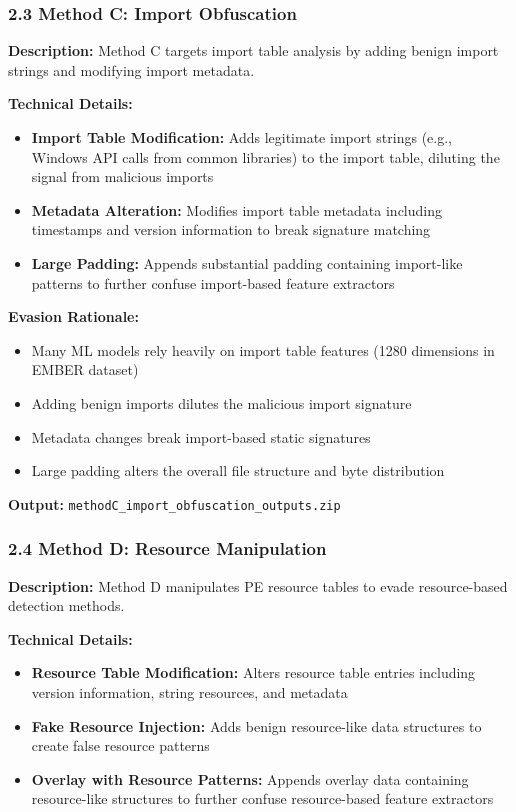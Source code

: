 \documentclass[12pt,letterpaper]{article}
\begin{document}
\subsubsection*{2.3 Method C: Import Obfuscation}

\textbf{Description:} Method C targets import table analysis by adding benign import strings and modifying import metadata.

\textbf{Technical Details:}
\begin{itemize}
    \item \textbf{Import Table Modification:} Adds legitimate import strings (e.g., Windows API calls from common libraries) to the import table, diluting the signal from malicious imports
    \item \textbf{Metadata Alteration:} Modifies import table metadata including timestamps and version information to break signature matching
    \item \textbf{Large Padding:} Appends substantial padding containing import-like patterns to further confuse import-based feature extractors
\end{itemize}

\textbf{Evasion Rationale:}
\begin{itemize}
    \item Many ML models rely heavily on import table features (1280 dimensions in EMBER dataset)
    \item Adding benign imports dilutes the malicious import signature
    \item Metadata changes break import-based static signatures
    \item Large padding alters the overall file structure and byte distribution
\end{itemize}

\textbf{Output:} \texttt{methodC\_import\_obfuscation\_outputs.zip}

\subsubsection*{2.4 Method D: Resource Manipulation}

\textbf{Description:} Method D manipulates PE resource tables to evade resource-based detection methods.

\textbf{Technical Details:}
\begin{itemize}
    \item \textbf{Resource Table Modification:} Alters resource table entries including version information, string resources, and metadata
    \item \textbf{Fake Resource Injection:} Adds benign resource-like data structures to create false resource patterns
    \item \textbf{Overlay with Resource Patterns:} Appends overlay data containing resource-like structures to further confuse resource-based feature extractors
\end{itemize}
\end{document}
